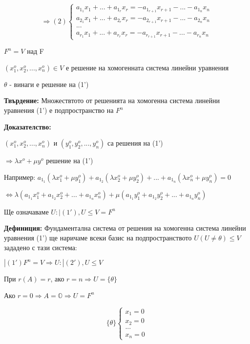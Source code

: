 \documentclass[fleqn,12pt]{article}
\begin{document}
\begin{flushleft}
\begin{equation*}
    \Rightarrow(2)\begin{cases}
        a_{1_1}x_1+...+a_{1_r}x_r = - a_{1_{r+1}}x_{r+1} - ... - a_{1_n}x_n\\
        a_{2_1}x_1+...+a_{2_r}x_r = - a_{2_{r+1}}x_{r+1} - ... - a_{2_n}x_n\\
        ...\\
        a_{r_1}x_1+...+a_{r_r}x_r = - a_{r_{r+1}}x_{r+1} - ... - a_{r_n}x_n
    \end{cases}
\end{equation*}

$ F^n = V $ над F

$ ( x_1^o, x_2^o, ..., x_n^o ) \in V $ е решение на хомогенната система линейни уравнения

$ \theta $ - винаги е решение на (1')

\vspace{5mm}

\textbf{Твърдение:} Множествтото от решенията на хомогенна система линейни уравнения (1') е подпространство на $ F^n $

\vspace{5mm}

\textbf{Доказателство:}

$ ( x_1^o, x_2^o, ..., x_n^o ) $ и $ ( y_1^o, y_2^o, ..., y_n^o )$ са решения на (1')

$\Rightarrow \lambda x^o + \mu y^o $ решение на (1')

Например: $ a_{1_1} (\lambda x_1^o + \mu y_1^o) + a_{1_2} (\lambda x_2^o + \mu y_2^o) + ... + a_{1_n} (\lambda x_n^o + \mu y_n^o) = 0 $

$ \Leftrightarrow \lambda (a_{1_1} x_1^o + a_{1_2} x_2^o + ... + a_{1_n} x_n^o) + \mu  (a_{1_1} y_1^o + a_{1_2} y_2^o + ... + a_{1_n} y_n^o) $

\vspace{5mm}

Ще означаваме $ U: | (1') , U \leq V = F^n $

\vspace{5mm}

\textbf{Дефиниция: } Фундаментална система от решения на хомогенна система линейни уравнения (1') ще наричаме всеки базис на подпространството $ U (U \neq \theta) \leq V $ зададено с тази система:

$ |(1') F^n = V \Rightarrow U: |(2'), U \leq V $

При $ r(A) = r $, ако $ r = n \Rightarrow U = \{ \theta \} $

Ако $ r = 0 \Rightarrow A = \mathbb{O} \Rightarrow U = F^n $


\begin{equation*}
   \{\theta\} \begin{cases}
        x_1 = 0 \\
        x_2 = 0 \\
        ...\\
        x_n = 0
    \end{cases}
\end{equation*}

\end{flushleft}
\end{document}

